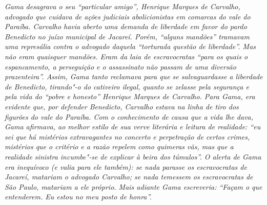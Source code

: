 \begin{flushleft}
{\footnotesize\itshape
Gama desagrava o seu ``particular amigo'', Henrique Marques de
Carvalho, advogado que cuidava de ações judiciais abolicionistas em
comarcas do vale do Paraíba. Carvalho havia aberto uma demanda de
liberdade em favor do pardo Benedicto no juízo municipal de Jacareí.
Porém, ``alguns mandões'' tramavam uma represália contra o advogado
daquela ``torturada questão de liberdade''. Mas não eram quaisquer
mandões. Eram da laia de escravocratas ``para os quais o espancamento, a
perseguição e o assassinato não passam de uma diversão prazenteira''.
Assim, Gama tanto reclamava para que se salvaguardasse a liberdade de
Benedicto, tirando"-o do cativeiro ilegal, quanto se zelasse pela
segurança e pela vida do ``pobre e honesto'' Henrique Marques de Carvalho.
Para Gama, era evidente que, por defender Benedicto, Carvalho estava na
linha de tiro dos figurões do vale do Paraíba. Com o conhecimento de
causa que a vida lhe dava, Gama afirmava, ao melhor estilo de sua verve
literária e leitura de realidade: ``eu sei que há mistérios extravagantes
no concerto e perpetração de certos crimes, mistérios que o critério e a
razão repelem como quimeras vãs, mas que a realidade sinistra incumbe"-se
de explicar à beira dos túmulos''. O alerta de Gama era inequívoco (e
valia para ele também): se nada parasse os escravocratas de Jacareí,
matariam o advogado Carvalho; se nada temessem os escravocratas de São
Paulo, matariam a ele próprio. Mais adiante Gama escreveria: ``Façam o
que entenderem. Eu estou no meu posto de honra''.}
\end{flushleft}

